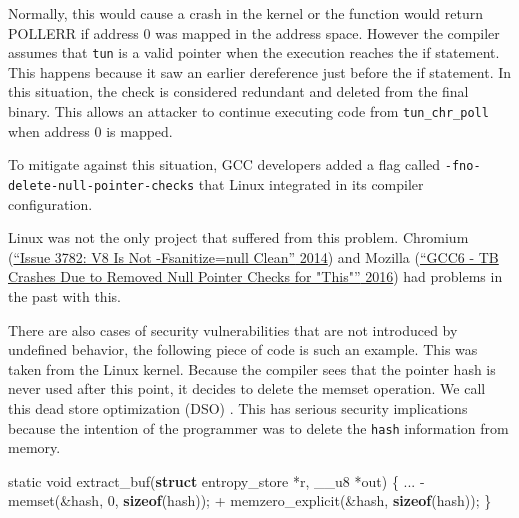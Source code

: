 \documentclass[
  a4paper,
]{report}
\newenvironment{Shaded}{}{}
\newcommand{\DataTypeTok}[1]{\textcolor[rgb]{0.56,0.13,0.00}{#1}}
\newcommand{\DecValTok}[1]{\textcolor[rgb]{0.25,0.63,0.44}{#1}}
\newcommand{\KeywordTok}[1]{\textcolor[rgb]{0.00,0.44,0.13}{\textbf{#1}}}
\newcommand{\NormalTok}[1]{#1}
\newcommand{\OperatorTok}[1]{\textcolor[rgb]{0.40,0.40,0.40}{#1}}
\begin{document}
Normally, this would cause a crash in the kernel or the function would
return POLLERR if address 0 was mapped in the address space. However the
compiler assumes that \texttt{tun} is a valid pointer when the execution
reaches the if statement. This happens because it saw an earlier
dereference just before the if statement. In this situation, the check
is considered redundant and deleted from the final binary. This allows
an attacker to continue executing code from \texttt{tun\_chr\_poll} when
address 0 is mapped.

To mitigate against this situation, GCC developers added a flag called
\texttt{-fno-delete-null-pointer-checks} that Linux integrated in its
compiler configuration.

Linux was not the only project that suffered from this problem. Chromium
(\protect\hyperlink{ref-ChromiumIssue}{{``Issue 3782: V8 Is Not
-Fsanitize=null Clean''} 2014}) and Mozilla
(\protect\hyperlink{ref-MozillaIssue}{{``GCC6 - TB Crashes Due to
Removed Null Pointer Checks for "This"''} 2016}) had problems in the
past with this.

There are also cases of security vulnerabilities that are not introduced
by undefined behavior, the following piece of code is such an example.
This was taken from the Linux kernel. Because the compiler sees that the
pointer hash is never used after this point, it decides to delete the
memset operation. We call this dead store optimization (DSO)
. This has serious security implications
because the intention of the programmer was to delete the \texttt{hash}
information from memory.

\begin{Shaded}
\begin{Highlighting}[]
\DataTypeTok{static} \DataTypeTok{void}\NormalTok{ extract\_buf}\OperatorTok{(}\KeywordTok{struct}\NormalTok{ entropy\_store }\OperatorTok{*}\NormalTok{r}\OperatorTok{,}\NormalTok{ \_\_u8 }\OperatorTok{*}\NormalTok{out}\OperatorTok{)} \OperatorTok{\{}
  \OperatorTok{...}
  \OperatorTok{{-}}\NormalTok{ memset}\OperatorTok{(\&}\NormalTok{hash}\OperatorTok{,} \DecValTok{0}\OperatorTok{,} \KeywordTok{sizeof}\OperatorTok{(}\NormalTok{hash}\OperatorTok{));}
  \OperatorTok{+}\NormalTok{ memzero\_explicit}\OperatorTok{(\&}\NormalTok{hash}\OperatorTok{,} \KeywordTok{sizeof}\OperatorTok{(}\NormalTok{hash}\OperatorTok{));}
\OperatorTok{\}}
\end{Highlighting}
\end{Shaded}
\end{document}
